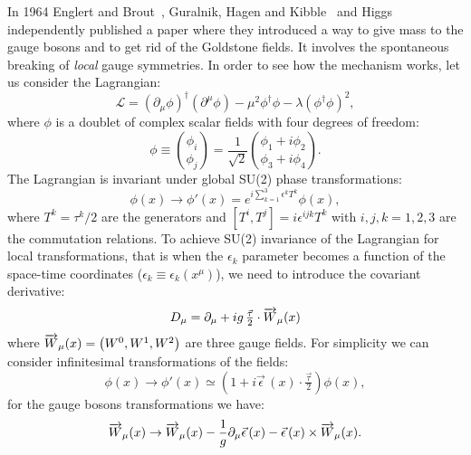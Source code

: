 In 1964 Englert and Brout~\cite{EnglertBroutPaper}, Guralnik, Hagen and
Kibble~\cite{GuralnikPaper} and Higgs~\cite{HiggsPaper} independently published
a paper where they introduced a way to give mass to the gauge bosons and to get
rid of the Goldstone fields. It involves the spontaneous breaking of
\emph{local} gauge symmetries. In order to see how the mechanism works, let us
consider the Lagrangian:
\begin{equation}
  \label{eq:33}
  \mathcal{L} =(\partial_{\mu} \phi)^{\dagger}(\partial^{\mu} \phi) -
  \mu^{2}\phi^{\dagger}\phi - \lambda (\phi^{\dagger}\phi)^{2},
\end{equation}
where $\phi$ is a doublet of complex scalar fields with four degrees of freedom:
\begin{equation}
  \label{eq:34}
  \phi \equiv \binom{\phi_{i}}{\phi_{j}} = \frac{1}{\sqrt{2}}
  \binom{\phi_{1} + i \phi_{2}}{\phi_{3} + i \phi_{4}}.
\end{equation}
The Lagrangian is invariant under global SU(2) phase transformations:
\begin{equation}
  \label{eq:32}
  \phi(x) \rightarrow \phi'(x) = e^{i \sum_{k = 1}^{3} \epsilon^{k} T^{k}}
  \phi(x),
\end{equation}
where $T^{k} = \tau^k/2$ are the generators and
$[T^{i},T^{j}] = i \epsilon^{ijk}T^{k}$ with $i,j,k = 1,2,3$ are the commutation
relations. To achieve SU(2) invariance of the Lagrangian for local
transformations, that is when the $\epsilon_k$ parameter becomes a function of
the space-time coordinates ($\epsilon_k \equiv \epsilon_k (x^\mu)$), we need to
introduce the covariant derivative:
\begin{equation}
  \label{eq:35}
  D_{\mu} = \partial_{\mu} + i g\,\tfrac{\vec \tau}{2} \cdot \overrightarrow{W}_{\mu}(x)
\end{equation}
where $\overrightarrow{W}_{\mu}(x) = \left( W^0, W^1, W^2 \right)$ are three gauge
fields. For simplicity we can consider infinitesimal transformations of the
fields:
\begin{equation}
  \label{eq:36}
  \phi(x) \rightarrow \phi'(x) \simeq \left( 1 + i \vec \epsilon\, (x) \cdot
    \tfrac{\vec \tau}{2} \right) \phi(x),
\end{equation}
for the gauge bosons transformations we have:
\begin{equation}
  \label{eq:37}
  \overrightarrow{W}_{\mu} (x) \rightarrow \overrightarrow{W}_{\mu}(x) -
  \frac{1}{g} \partial_{\mu} \vec \epsilon \, (x) - \vec \epsilon\,(x)
  \times \overrightarrow{W}_{\mu} (x).
\end{equation}
